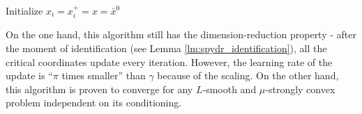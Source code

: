 {\begin{algorithm}
\begin{center}
\begin{tcolorbox}[title=\textsc{Worker } $i$, box align=center]
Initialize $x_i = x_i^+ = x = \bar x^0$\\
\end{tcolorbox}
\end{center}
\end{algorithm}

On the one hand, this algorithm still has the dimension-reduction property - after the moment of identification (see Lemma \ref{lm:spydr_identification}), all the critical coordinates update every iteration. However, the learning rate of the update is ``$\pi$ times smaller'' than $\gamma$ because of the scaling. On the other hand, this algorithm is proven to converge for any $L$-smooth and $\mu$-strongly convex problem independent on its conditioning.

}
